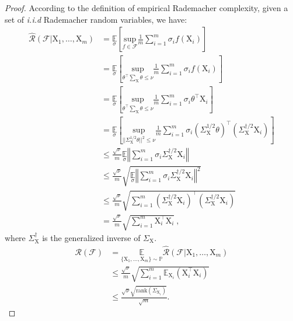 \begin{proof}
    According to the definition of empirical Rademacher complexity, given a set of \textit{i.i.d} Rademacher random variables, we have:
    \begin{equation*}
    \begin{aligned}
        \hat{\mathcal{R}}(\mathcal{F}|\mathrm{X}_1,\dots,\mathrm{X}_m)&=\underset{\sigma}{\mathbb{E}}\left[\underset{f\in\mathcal{F}}{\text{sup}}\frac{1}{m}\sum_{i=1}^m\sigma_if(\mathrm{X}_i)\right] \\
        &=\underset{\sigma}{\mathbb{E}}\left[\underset{\theta^\top\sum_\mathrm{X}\theta\leq\nu}{\text{sup}}\frac{1}{m}\sum_{i=1}^m\sigma_if(\mathrm{X}_i)\right] \\
        &=\underset{\sigma}{\mathbb{E}}\left[\underset{\theta^\top\sum_\mathrm{X}\theta\leq\nu}{\text{sup}}\frac{1}{m}\sum_{i=1}^m\sigma_i\theta^\top\mathrm{X}_i\right] \\
        &=\underset{\sigma}{\mathbb{E}}\left[\underset{||\Sigma_{\mathrm{X}}^{1/2}\theta||^2\leq \nu}{\text{sup}}\frac{1}{m}\sum_{i=1}^m\sigma_i(\Sigma_{\mathrm{X}}^{1/2}\theta)^\top(\Sigma_{\mathrm{X}}^{\dagger/2}\mathrm{X}_i)\right] \\
        & \leq \frac{\sqrt{\nu}}{m}\underset{\sigma}{\mathbb{E}}\left\Vert\sum_{i=1}^m\sigma_i\Sigma_{\mathrm{X}}^{\dagger/2}\mathrm{X}_i\right\Vert \\
        &\leq \frac{\sqrt{\nu}}{m}\sqrt{\underset{\sigma}{\mathbb E}\left\Vert\sum_{i=1}^m\sigma_i\Sigma_{\mathrm{X}}^{\dagger/2}\mathrm{X}_i\right\Vert^{2}} \\
        &\leq \frac{\sqrt{\nu}}{m}\sqrt{\sum_{i=1}^m{(\Sigma_{\mathrm{X}}^{\dagger/2}\mathrm{X}_i)}^\top(\Sigma_{\mathrm{X}}^{\dagger/2}\mathrm{X}_i)} \\
        &= \frac{\sqrt{\nu}}{m} \sqrt{\sum_{i=1}^m\mathrm{X}_i^\top\mathrm{X}_i}\ ,
    \end{aligned}
    \end{equation*}
    where $\Sigma_\mathrm{X}^{\dagger}$ is the generalized inverse of $\Sigma_\mathrm{X}$. 
    \begin{equation*}
    \begin{aligned}
        \mathcal{R}(\mathcal{F})&=\underset{\{\mathrm{X}_1,\dots,\mathrm{X}_m\}\sim \mathbb{P}}{\mathbb{E}}\hat{\mathcal{R}}(\mathcal{F}|\mathrm{X}_1,\dots,\mathrm{X}_m) \\ &\leq \frac{\sqrt{\nu}}{m}\sqrt{\sum_{i=1}^m\mathbb{E}_{\mathrm{X}_i}(\mathrm{X}_i^\top\mathrm{X}_i)} \\
        &\leq \frac{\sqrt{\nu}\sqrt{\text{rank}(\Sigma_{\mathrm{X}_i})}}{\sqrt{m}}.
    \end{aligned}
    \end{equation*}
\end{proof}

